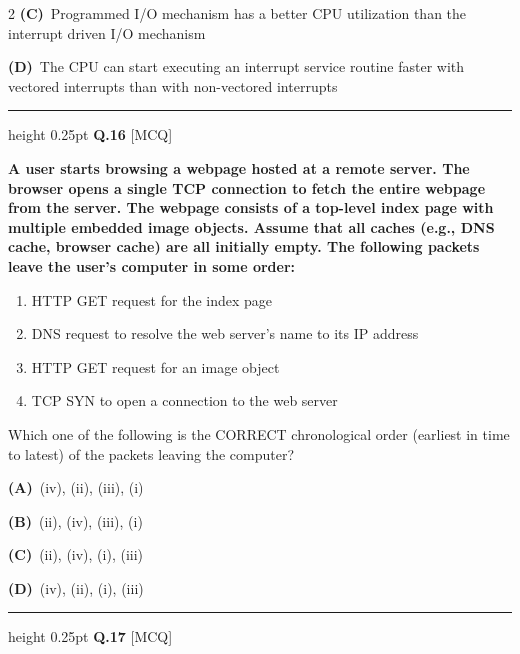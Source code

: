 \documentclass[a4paper,10pt,twoside]{article}
\begin{document}
\begin{multicols}{2}
\textbf{(C)}~Programmed I/O mechanism has a better CPU utilization than the interrupt driven I/O mechanism\par\vspace{2pt}\noindent
\textbf{(D)}~The CPU can start executing an interrupt service routine faster with vectored interrupts than with non-vectored interrupts
\par\vspace{6pt}\hrule height 0.25pt\vspace{6pt}
\noindent\textbf{Q.16} \hfill {\footnotesize\textsf{[MCQ]}}
\par\vspace{2pt}
{\bfseries A user starts browsing a webpage hosted at a remote server. The browser opens a single TCP connection to fetch the entire webpage from the server. The webpage consists of a top-level index page with multiple embedded image objects. Assume that all caches (e.g., DNS cache, browser cache) are all initially empty. The following packets leave the user's computer in some order:
\begin{enumerate}[label=(\roman*),itemsep=0pt,topsep=2pt]
\item HTTP GET request for the index page
\item DNS request to resolve the web server's name to its IP address
\item HTTP GET request for an image object
\item TCP SYN to open a connection to the web server
\end{enumerate}
Which one of the following is the CORRECT chronological order (earliest in time to latest) of the packets leaving the computer? \par}
\par\vspace{2pt}\noindent
\textbf{(A)}~(iv), (ii), (iii), (i)\par\vspace{2pt}\noindent
\textbf{(B)}~(ii), (iv), (iii), (i)\par\vspace{2pt}\noindent
\textbf{(C)}~(ii), (iv), (i), (iii)\par\vspace{2pt}\noindent
\textbf{(D)}~(iv), (ii), (i), (iii)
\par\vspace{6pt}\hrule height 0.25pt\vspace{6pt}
\noindent\textbf{Q.17} \hfill {\footnotesize\textsf{[MCQ]}}
\par\vspace{2pt}

\end{multicols}
\end{document}
